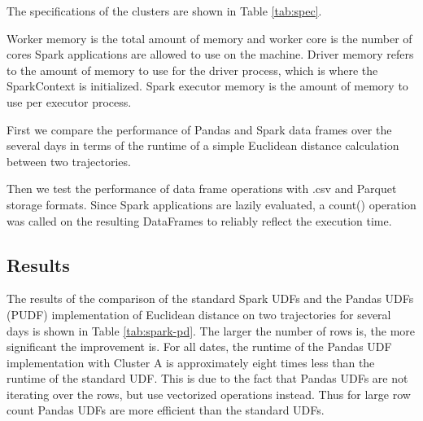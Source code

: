 The specifications of the clusters are shown in Table \ref{tab:spec}.
\begin{table}[h]
    \centering
    \caption{Specifications of test clusters}
    \label{tab:spec}
\end{table}

Worker memory is the total amount of memory and worker core is the number of cores Spark applications are allowed to use on the machine. Driver memory refers to the amount of memory to use for the driver process, which is where the SparkContext is initialized. Spark executor memory is the amount of memory to use per executor process. \cite{spark:rdds}

First we compare the performance of Pandas and Spark data frames over the several days in terms of the runtime of a simple Euclidean distance calculation between two trajectories.

Then we test the performance of data frame operations with .csv and Parquet storage formats. Since Spark applications are lazily evaluated, a count() operation was called on the resulting DataFrames to reliably reflect the execution time.

\subsection{Results}
The results of the comparison of the standard Spark UDFs and the Pandas UDFs (PUDF) implementation of Euclidean distance on two trajectories for several days is shown in Table \ref{tab:spark-pd}. The larger the number of rows is, the more significant the improvement is. For all dates, the runtime of the Pandas UDF implementation with Cluster A is approximately eight times less than the runtime of the standard UDF. This is due to the fact that Pandas UDFs are not iterating over the rows, but use vectorized operations instead. Thus for large row count Pandas UDFs are more efficient than the standard UDFs. 

